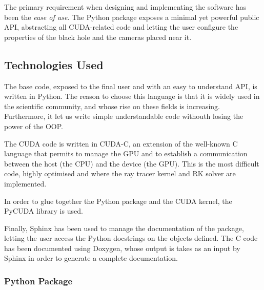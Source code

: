 The primary requirement when designing and implementing the software has been the \emph{ease of use}. The Python package exposes a minimal yet powerful public \ac{API}, abstracting all \ac{CUDA}-related code and letting the user configure the properties of the black hole and the cameras placed near it.

\subsection{Technologies Used}

The base code, exposed to the final user and with an easy to understand \ac{API}, is written in Python. The reason to choose this language is that it is widely used in the scientific community, and whose rise on these fields is increasing. Furthermore, it let us write simple understandable code withouth losing the power of the \ac{OOP}.

The \ac{CUDA} code is written in \ac{CUDA}-C, an extension of the well-known C language that permits to manage the \ac{GPU} and to establish a communication between the host (the \ac{CPU}) and the device (the \ac{GPU}). This is the most difficult code, highly optimised and where the ray tracer kernel and \ac{RK} solver are implemented.

In order to glue together the Python package and the \ac{CUDA} kernel, the PyCUDA library is used.

Finally, Sphinx has been used to manage the documentation of the package, letting the user access the Python docstrings on the objects defined. The C code has been documented using Doxygen, whose output is takes as an input by Sphinx in order to generate a complete documentation.

\subsubsection*{Python Package}

